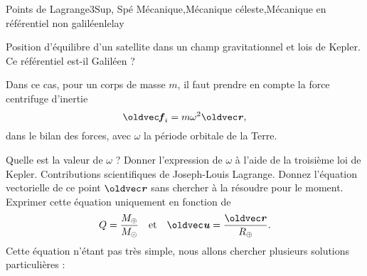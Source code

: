 \begin{exercise}{Points de Lagrange}{3}{Sup, Spé}
{Mécanique,Mécanique céleste,Mécanique en référentiel non galiléen}{lelay}

\begin{questions}
    \questioncours Position d'équilibre d'un satellite dans un champ gravitationnel et lois de Kepler.
\question Ce référentiel est-il Galiléen ?
\begin{EnvUplevel}
Dans ce cas, pour un corps de masse $m$, il faut prendre en compte la force centrifuge d'inertie
$$\vf_i = m\omega^2\vr,$$
dans le bilan des forces, avec $\omega$ la période orbitale de la Terre.
\end{EnvUplevel}
    \question Quelle est la valeur de $\omega$ ? Donner l'expression de $\omega$ à l'aide de la troisième loi de Kepler.
    \questionbonus Contributions scientifiques de Joseph-Louis Lagrange.
    \question Donnez l'équation vectorielle de ce point $\vr$ sans chercher à la résoudre pour le moment. \\
    Exprimer cette équation uniquement en fonction de
    $$Q = \dfrac{M_\oplus}{M_\odot} \qqtext{et} \vu = \dfrac{\vr}{R_\oplus}.$$
    \question Cette équation n'étant pas très simple, nous allons chercher plusieurs solutions particulières :
\end{questions}
\end{exercise}
